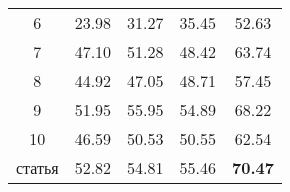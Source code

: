 \begin{table}[htp!]
\begin{tabular}{ccccc}
6                               & 23.98                              & 31.27                                   & 35.45                                   & 52.63                                                        \\
7                               & 47.10                              & 51.28                                   & 48.42                                   & 63.74                                                        \\
8                               & 44.92                              & 47.05                                   & 48.71                                   & 57.45                                                        \\
9                               & 51.95                              & 55.95                                   & 54.89                                   & 68.22                                                        \\
10                              & 46.59                              & 50.53                                   & 50.55                                   & 62.54                                                        \\ \hline
\cellcolor[HTML]{C0C0C0} статья & \cellcolor[HTML]{C0C0C0}52.82      & \cellcolor[HTML]{C0C0C0}54.81           & \cellcolor[HTML]{C0C0C0}55.46           & \cellcolor[HTML]{C0C0C0}\textbf{70.47}                       \\ \hline
\end{tabular}
\end{table}
